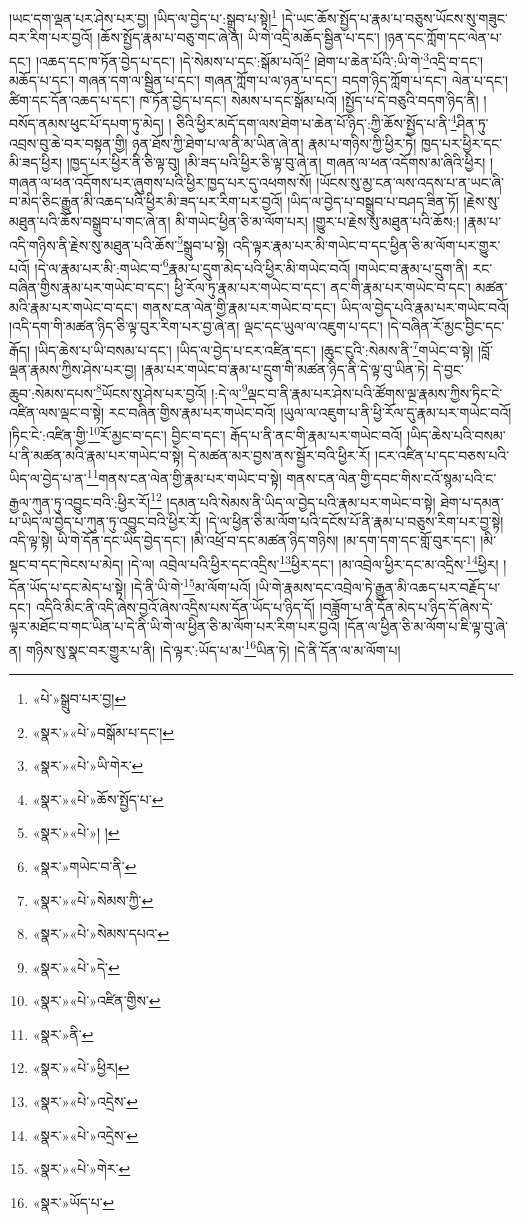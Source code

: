 །ཡང་དག་ལྡན་པར་ཤེས་པར་བྱ། །ཡིད་ལ་བྱེད་པ་:སྒྲུབ་པ་སྟེ།\footnote{«པེ་»སྒྲུབ་པར་བྱ།} །དེ་ཡང་ཆོས་སྤྱོད་པ་རྣམ་པ་བཅུས་ཡོངས་སུ་གཟུང་བར་རིག་པར་བྱའོ། །ཆོས་སྤྱོད་རྣམ་པ་བཅུ་གང་ཞེ་ན། ཡི་གེ་འདྲི་མཆོད་སྦྱིན་པ་དང་། །ཉན་དང་ཀློག་དང་ལེན་པ་དང་། །འཆད་དང་ཁ་ཏོན་བྱེད་པ་དང་། །དེ་སེམས་པ་དང་:སྒོམ་པའོ།\footnote{«སྣར་»«པེ་»བསྒོམ་པ་དང་།} །ཐེག་པ་ཆེན་པོའི་:ཡི་གེ་\footnote{«སྣར་»«པེ་»ཡི་གེར་}འདྲི་བ་དང་། མཆོད་པ་དང་། གཞན་དག་ལ་སྦྱིན་པ་དང་། གཞན་ཀློག་པ་ལ་ཉན་པ་དང་། བདག་ཉིད་ཀློག་པ་དང་། ལེན་པ་དང་། ཚིག་དང་དོན་འཆད་པ་དང་། ཁ་ཏོན་བྱེད་པ་དང་། སེམས་པ་དང་སྒོམ་པའོ། །སྤྱོད་པ་དེ་བཅུའི་བདག་ཉིད་ནི། །བསོད་ནམས་ཕུང་པོ་དཔག་ཏུ་མེད། །
ཅིའི་ཕྱིར་མདོ་དག་ལས་ཐེག་པ་ཆེན་པོ་ཉིད་:ཀྱི་ཆོས་སྤྱོད་པ་ནི་\footnote{«སྣར་»«པེ་»ཆོས་སྤྱོད་པ་}ཤིན་ཏུ་འབྲས་བུ་ཆེ་བར་བསྟན་གྱི། ཉན་ཐོས་ཀྱི་ཐེག་པ་ལ་ནི་མ་ཡིན་ཞེ་ན། རྣམ་པ་གཉིས་ཀྱི་ཕྱིར་ཏེ། ཁྱད་པར་ཕྱིར་དང་མི་ཟད་ཕྱིར། །ཁྱད་པར་ཕྱིར་ནི་ཅི་ལྟ་བུ། །མི་ཟད་པའི་ཕྱིར་ཅི་ལྟ་བུ་ཞེ་ན། གཞན་ལ་ཕན་འདོགས་མ་ཞིའི་ཕྱིར། །གཞན་ལ་ཕན་འདོགས་པར་ཞུགས་པའི་ཕྱིར་ཁྱད་པར་དུ་འཕགས་སོ། །ཡོངས་སུ་མྱ་ངན་ལས་འདས་པ་ན་ཡང་ཞི་བ་མེད་ཅིང་རྒྱུན་མི་འཆད་པའི་ཕྱིར་མི་ཟད་པར་རིག་པར་བྱའོ། །ཡིད་ལ་བྱེད་པ་བསྒྲུབ་པ་བཤད་ཟིན་ཏོ། །རྗེས་སུ་མཐུན་པའི་ཆོས་བསྒྲུབ་པ་གང་ཞེ་ན། མི་གཡེང་ཕྱིན་ཅི་མ་ལོག་པར། །གྱུར་པ་རྗེས་སུ་མཐུན་པའི་ཆོས:། །རྣམ་པ་འདི་གཉིས་ནི་རྗེས་སུ་མཐུན་པའི་ཆོས་\footnote{«སྣར་»«པེ་»། །}སྒྲུབ་པ་སྟེ། འདི་ལྟར་རྣམ་པར་མི་གཡེང་བ་དང་ཕྱིན་ཅི་མ་ལོག་པར་གྱུར་པའོ། །དེ་ལ་རྣམ་པར་མི་:གཡེང་བ་\footnote{«སྣར་»གཡེང་བ་ནི་}རྣམ་པ་དྲུག་མེད་པའི་ཕྱིར་མི་གཡེང་བའོ། །གཡེང་བ་རྣམ་པ་དྲུག་ནི། རང་བཞིན་གྱིས་རྣམ་པར་གཡེང་བ་དང་། ཕྱི་རོལ་ཏུ་རྣམ་པར་གཡེང་བ་དང་། ནང་གི་རྣམ་པར་གཡེང་བ་དང་། མཚན་མའི་རྣམ་པར་གཡེང་བ་དང་། གནས་ངན་ལེན་གྱི་རྣམ་པར་གཡེང་བ་དང་། ཡིད་ལ་བྱེད་པའི་རྣམ་པར་གཡེང་བའོ། །འདི་དག་གི་མཚན་ཉིད་ཅི་ལྟ་བུར་རིག་པར་བྱ་ཞེ་ན། ལྡང་དང་ཡུལ་ལ་འཇུག་པ་དང་། །དེ་བཞིན་རོ་མྱང་བྱིང་དང་རྒོད། །ཡིད་ཆེས་པ་ཡི་བསམ་པ་དང་། །ཡིད་ལ་བྱེད་པ་ངར་འཛིན་དང་། །ཆུང་ངུའི་:སེམས་ནི་\footnote{«སྣར་»«པེ་»སེམས་ཀྱི་}གཡེང་བ་སྟེ། །བློ་ལྡན་རྣམས་ཀྱིས་ཤེས་པར་བྱ། །རྣམ་པར་གཡེང་བ་རྣམ་པ་དྲུག་གི་མཚན་ཉིད་ནི་དེ་ལྟ་བུ་ཡིན་ཏེ། དེ་བྱང་ཆུབ་:སེམས་དཔས་\footnote{«སྣར་»«པེ་»སེམས་དཔའ་}ཡོངས་སུ་ཤེས་པར་བྱའོ། །:དེ་ལ་\footnote{«སྣར་»«པེ་»དེ་}ལྡང་བ་ནི་རྣམ་པར་ཤེས་པའི་ཚོགས་ལྔ་རྣམས་ཀྱིས་ཏིང་ངེ་འཛིན་ལས་ལྡང་བ་སྟེ། རང་བཞིན་གྱིས་རྣམ་པར་གཡེང་བའོ། །ཡུལ་ལ་འཇུག་པ་ནི་ཕྱི་རོལ་དུ་རྣམ་པར་གཡེང་བའོ། །ཏིང་ངེ་:འཛིན་གྱི་\footnote{«སྣར་»«པེ་»འཛིན་གྱིས་}རོ་མྱང་བ་དང་། བྱིང་བ་དང་། རྒོད་པ་ནི་ནང་གི་རྣམ་པར་གཡེང་བའོ། །ཡིད་ཆེས་པའི་བསམ་པ་ནི་མཚན་མའི་རྣམ་པར་གཡེང་བ་སྟེ། དེ་མཚན་མར་བྱས་ནས་སྦྱོར་བའི་ཕྱིར་རོ། །ངར་འཛིན་པ་དང་བཅས་པའི་ཡིད་ལ་བྱེད་པ་ན་\footnote{«སྣར་»ནི་}གནས་ངན་ལེན་གྱི་རྣམ་པར་གཡེང་བ་སྟེ། གནས་ངན་ལེན་གྱི་དབང་གིས་ངའོ་སྙམ་པའི་ང་རྒྱལ་ཀུན་ཏུ་འབྱུང་བའི་:ཕྱིར་རོ།\footnote{«སྣར་»«པེ་»ཕྱིར།} །དམན་པའི་སེམས་ནི་ཡིད་ལ་བྱེད་པའི་རྣམ་པར་གཡེང་བ་སྟེ། ཐེག་པ་དམན་པ་ཡིད་ལ་བྱེད་པ་ཀུན་ཏུ་འབྱུང་བའི་ཕྱིར་རོ། །དེ་ལ་ཕྱིན་ཅི་མ་ལོག་པའི་དངོས་པོ་ནི་རྣམ་པ་བཅུས་རིག་པར་བྱ་སྟེ། འདི་ལྟ་སྟེ། ཡི་གེ་དོན་དང་ཡིད་བྱེད་དང་། །མི་འཕྲོ་བ་དང་མཚན་ཉིད་གཉིས། །མ་དག་དག་དང་གློ་བུར་དང་། །མི་སྡང་བ་དང་ཁེངས་པ་མེད། །དེ་ལ། འབྲེལ་པའི་ཕྱིར་དང་འདྲིས་\footnote{«སྣར་»«པེ་»འདྲེས་}ཕྱིར་དང་། །མ་འབྲེལ་ཕྱིར་དང་མ་འདྲིས་\footnote{«སྣར་»«པེ་»འདྲེས་}ཕྱིར། །དོན་ཡོད་པ་དང་མེད་པ་སྟེ། །དེ་ནི་ཡི་གེ་\footnote{«སྣར་»«པེ་»གེར་}མ་ལོག་པའོ། །ཡི་གེ་རྣམས་དང་འབྲེལ་ཏེ་རྒྱུན་མི་འཆད་པར་བརྗོད་པ་དང་། འདིའི་མིང་ནི་འདི་ཞེས་བྱའོ་ཞེས་འདྲིས་པས་དོན་ཡོད་པ་ཉིད་དོ། །བཟློག་པ་ནི་དོན་མེད་པ་ཉིད་དོ་ཞེས་དེ་ལྟར་མཐོང་བ་གང་ཡིན་པ་དེ་ནི་ཡི་གེ་ལ་ཕྱིན་ཅི་མ་ལོག་པར་རིག་པར་བྱའོ། །དོན་ལ་ཕྱིན་ཅི་མ་ལོག་པ་ཇི་ལྟ་བུ་ཞེ་ན། གཉིས་སུ་སྣང་བར་གྱུར་པ་ནི། །དེ་ལྟར་:ཡོད་པ་མ་\footnote{«སྣར་»ཡོད་པ་}ཡིན་ཏེ། །དེ་ནི་དོན་ལ་མ་ལོག་པ། 